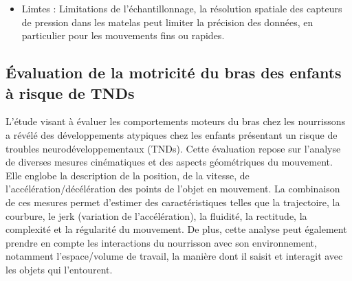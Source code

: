 \documentclass[5pt]{article}
\begin{document}
\begin{itemize}
\begin{itemize}[label={\textbullet}, leftmargin=*]
        \item Limtes : Limitations de l'échantillonnage, la résolution spatiale des capteurs de pression dans les matelas peut limiter la précision des données, en particulier pour les mouvements fins ou rapides.
    \end{itemize}
\end{itemize}

\subsection{Évaluation de la motricité du bras des enfants à risque de TNDs}

\par L'étude visant à évaluer les comportements moteurs du bras chez les nourrissons a révélé des développements atypiques chez les enfants présentant un risque de troubles neurodéveloppementaux (TNDs). Cette évaluation repose sur l'analyse de diverses mesures cinématiques et des aspects géométriques du mouvement. Elle englobe la description de la position, de la vitesse, de l'accélération/décélération des points de l'objet en mouvement. La combinaison de ces mesures permet d'estimer des caractéristiques telles que la trajectoire, la courbure, le jerk (variation de l'accélération), la fluidité, la rectitude, la complexité et la régularité du mouvement. De plus, cette analyse peut également prendre en compte les interactions du nourrisson avec son environnement, notamment l'espace/volume de travail, la manière dont il saisit et interagit avec les objets qui l'entourent. \\  
\end{document}
